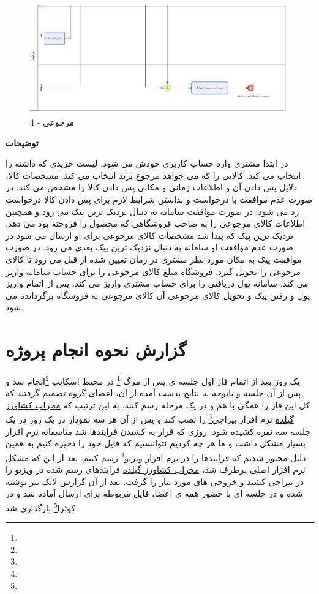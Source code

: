 \documentclass[12pt,a4paper]{article}
\begin{document}
		\begin{figure}[h!]
			\begin{center}
				\includegraphics[width=14cm]{images/Bizagi Return 4.png}	
			\end{center}
			\caption{مرجوعی - 4}
		\end{figure}
		
		\textbf{توضیحات}
		
		
		در ابتدا مشتری وارد حساب کاربری خودش می شود. لیست خریدی که داشته را انتخاب می کند. کالایی را که می خواهد مرجوع بزند انتخاب می کند. مشخصات کالا، دلایل پس دادن آن و اطلاعات زمانی و مکانی پس دادن کالا را مشخص می کند. در صورت عدم موافقت با درخواست و نداشتن شرایط لازم برای پس دادن کالا درخواست رد می شود. در صورت موافقت سامانه به دنبال نزدیک ترین پیک می رود و همچنین اطلاعات کالای مرجوعی را به صاحب فروشگاهی که محصول را فروخته بود می دهد. نزدیک ترین پیک که پیدا شد مشخصات کالای مرجوعی برای او ارسال می شود در صورت عدم موافقت او سامانه به دنبال نزدیک ترین پیک بعدی می رود. در صورت موافقت پیک به مکان مورد نظر مشتری در زمان تعیین شده از قبل می رود تا کالای مرجوعی را تحویل گیرد. فروشگاه مبلغ کالای مرجوعی را برای حساب سامانه واریز می کند. سامانه پول دریافتی را برای حساب مشتری واریز می کند. پس از اتمام واریز پول و رفتن پیک و تحویل کالای مرجوعی آن کالای مرجوعی به فروشگاه برگردانده می شود.
		
		\pagebreak

\section{گزارش نحوه انجام پروژه} \label{section.report}
یک روز بعد از اتمام فاز اول جلسه ی پس از مرگ \footnote{} در محیط اسکایپ \footnote{}انجام شد و پس از آن جلسه و باتوجه به نتایج بدست آمده از آن، اعضای گروه تصمیم گرفتند که کل این فاز را همگی با هم و در یک مرحله رسم کنند. به این ترتیب که \underline{محراب کشاورز گیلده} نرم افزار بیزاجی\footnote{} را نصب کند و پس از آن هر سه نمودار در یک روز در یک جلسه سه نفره کشیده شود. روزی که قرار به کشیدن فرایندها شد متاسفانه نرم افزار بسیار مشکل داشت و ما هر چه کردیم نتوانستیم که فایل خود را ذخیره کنیم به همین دلیل مجبور شدیم که فرایندها را در نرم افزار ویزیو\footnote{} رسم کنیم. بعد از این که مشکل نرم افزار اصلی برطرف شد، \underline{محراب کشاورز گیلده} فرایندهای رسم شده در ویزیو را در بیزاجی کشید و خروجی های مورد نیاز را گرفت. بعد از آن گزارش لاتک نیز نوشته شده و در جلسه ای با حضور همه ی اعضا، فایل مربوطه برای ارسال آماده شد و در کوئرا\footnote{} بارگذاری شد.
\end{document}
